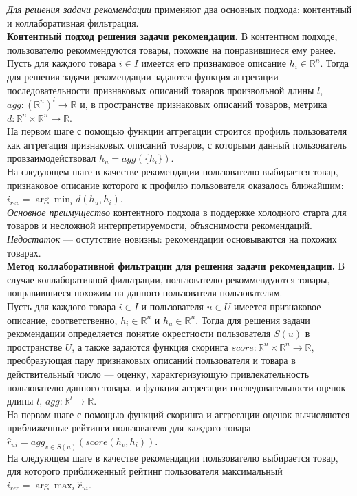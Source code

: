 \documentclass[a4paper,14pt,oneside]{mipt-thesis-ms}
\begin{document}
{\it Для решения задачи рекомендации} применяют два основных подхода: контентный и коллаборативная фильтрация.
\\

{\bf Контентный подход решения задачи рекомендации.} В контентном подходе, пользователю рекоммендуются товары, похожие на понравившиеся ему ранее.\\

Пусть для каждого товара $i \in I$ имеется его признаковое описание $h_i \in \mathbb{R}^n$. Тогда для решения задачи рекомендации задаются функция аггрегации последовательности признаковых описаний товаров произвольной длины $l$, $agg: (\mathbb{R}^n)^l \rightarrow \mathbb{R}$ и, в пространстве признаковых описаний товаров, метрика $d: \mathbb{R}^n \times \mathbb{R}^n \rightarrow \mathbb{R}$. \\
На первом шаге с помощью функции аггрегации строится профиль пользователя как аггрегация признаковых описаний товаров, с которыми данный пользователь провзаимодействовал $h_u = agg(\{h_i\})$. \\
На следующем шаге в качестве рекомендации пользователю выбирается товар, признаковое описание которого к профилю пользователя оказалось ближайшим: $i_{rec} = \arg \min_i d(h_u, h_i)$.\cite{lops01}\\

{\it Основное преимущество} контентного подхода в поддержке холодного старта для товаров и несложной интерпретируемости, объяснимости рекомендаций. {\it Недостаток} --- остутствие новизны: рекомендации основываются на похожих товарах.\\

{\bf Метод коллаборативной фильтрации для решения задачи рекомендации.} В случае коллаборативной фильтрации, пользователю рекоммендуются товары, понравившиеся похожим на данного пользователя пользователям.\\

Пусть для каждого товара $i \in I$ и пользователя $u \in U$ имеется признаковое описание, соответственно, $h_i \in \mathbb{R}^n$ и $h_u \in \mathbb{R}^n$. Тогда для решения задачи рекомендации определяется понятие окрестности пользователя $S(u)$ в пространстве $U$, а также задаются функция скоринга $score: \mathbb{R}^n \times \mathbb{R}^n \rightarrow \mathbb{R}$, преобразующая пару признаковых описаний пользователя и товара в действительный число --- оценку, характеризующую привлекательность пользователю данного товара, и функция аггрегации последовательности оценок длины $l$, $agg: \mathbb{R}^l \rightarrow \mathbb{R}$. \\
На первом шаге с помощью функций скоринга и аггрегации оценок вычисляются приближенные рейтинги пользователя для каждого товара $\hat r_{ui} = {agg}_{v \in S(u)}(score(h_v, h_i))$. \\
На следующем шаге в качестве рекомендации пользователю выбирается товар, для которого приближенный рейтинг пользователя максимальный $i_{rec} = \arg \max_i \hat r_{ui}$. \cite{peng01}
\\
\end{document}
